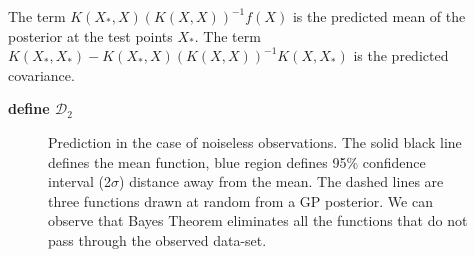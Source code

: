 The term \(K(X_{*}, X)( K(X, X) )^{-1}f(X)\) is the predicted mean of the posterior at the test points \(X_{*}\). The term \(K(X_{*}, X_{*}) - K(X_{*}, X)( K(X, X) )^{-1} K(X, X_{*})\) is the predicted covariance. 

\textbf{define $\mathcal{D}_{2}$}


\begin{figure}[!ht]
  \centering
    \quad
{}\quad
  
       \caption{Prediction in the case of noiseless observations. The solid black line defines the mean function, blue region defines 95\% confidence interval (2\(\sigma\)) distance away from the mean. The dashed lines are three functions drawn at random from a GP posterior. We can observe that Bayes Theorem eliminates all the functions that do not pass through the observed data-set.}
       \label{figGPNoiseLessPosteriors}
\end{figure}

